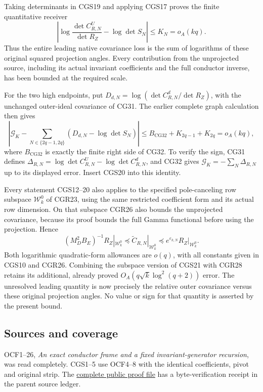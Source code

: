 \documentclass[11pt]{article}
\begin{document}
Taking determinants in CGS19 and applying CGS17 proves the finite quantitative receiver \[
\boxed{\left|\log\frac{\det C_{R,N}^U}{\det R_Z}
                 -\log\det S_N\right|\le K_N=o_A(kq).}
\tag{CGS20}
\] Thus the entire leading native covariance loss is the sum of logarithms of these original squared projection angles. Every contribution from the unprojected source, including its actual invariant coefficients and the full conductor inverse, has been bounded at the required scale.

For the two high endpoints, put \(D_{d,N}=\log(\det C_{R,N}^d/\det R_Z)\), with the unchanged outer-ideal covariance of CG31. The earlier complete graph calculation then gives \[
\left|\mathcal G_K-
\sum_{N\in\{2q-1,2q\}}(D_{d,N}-\log\det S_N)\right|
\le B_{\mathrm{CG32}}+K_{2q-1}+K_{2q}=o_A(kq),
\tag{CGS21}
\] where \(B_{\mathrm{CG32}}\) is exactly the finite right side of CG32. To verify the sign, CG31 defines \(\Delta_{R,N}=\log\det C_{R,N}^U-\log\det C_{R,N}^d\), and CG32 gives \(\mathcal G_K=-\sum_N\Delta_{R,N}\) up to its displayed error. Insert CGS20 into this identity.

Every statement CGS12--20 also applies to the specified pole-canceling row subspace \(\mathcal W_k^0\) of CGR23, using the same restricted coefficient form and its actual row dimension. On that subspace CGR26 also bounds the unprojected covariance, because its proof bounds the full Gamma functional before using the projection. Hence \[
(M_D^2B_E)^{-1}R_Z|_{\mathcal W_k^0}
\preceq\widetilde C_{R,N}|_{\mathcal W_k^0}
\preceq e^{\varepsilon_{k,N}}R_Z|_{\mathcal W_k^0}.
\tag{CGS22}
\] Both logarithmic quadratic-form allowances are \(o(q)\), with all constants given in CGS10 and CGR26. Combining the subspace version of CGS21 with CGR28 retains its additional, already proved \(O_A(q\sqrt{k}\log^2(q+2))\) error. The unresolved leading quantity is now precisely the relative outer covariance versus these original projection angles. No value or sign for that quantity is asserted by the present bound.

\subsection{Sources and coverage}\label{sources-and-coverage}

OCF1--26, \emph{An exact conductor frame and a fixed invariant-generator recursion}, was read completely. CGS1--5 use OCF4--8 with the identical coefficients, pivot and original strip. The \href{https://github.com/KokunoYumeto/zeta-function-research-reader/blob/5992ad50c0f2a06921f1fcaded7b4e38097c0739/workbenches/splitzero-tandem/continuations/20260920-original-kernel-mixed-determinants/providers/ORIGINAL_CONDUCTOR_STRIP_FRAME.tex\#L27}{complete public proof file} has a byte-verification receipt in the parent source ledger.
\end{document}
